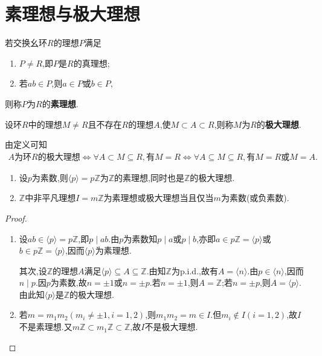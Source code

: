\documentclass[../../main.tex]{subfiles}%
\begin{document}
\section{素理想与极大理想}

\begin{definition}[素理想]
若交换幺环$R$的理想$P$满足
\begin{enumerate}[(1)]
\item $P \neq R$,即$P$是$R$的真理想;
\item 若$ab \in P$,则$a \in P$或$b \in P$,
\end{enumerate}
则称$P$为$R$的\textbf{素理想}.
\end{definition}

\begin{definition}[极大理想]
设环$R$中的理想$M \neq R$且不存在$R$的理想$A$,使$M \subset A \subset R$,则称$M$为$R$的\textbf{极大理想}.
\end{definition}
\begin{remark}
由定义可知
\begin{align*}
A\text{为环}R\text{的极大理想}\Longleftrightarrow \forall A\subset M\subseteq R,\text{有}M=R\Longleftrightarrow \forall A\subseteq M\subseteq R,\text{有}M=R\text{或}M=A.
\end{align*}
\end{remark}

\begin{proposition}
\begin{enumerate}[(1)]
\item 设$p$为素数,则$\langle p \rangle=p\mathbb{Z}$为$\mathbb{Z}$的素理想,同时也是$\mathbb{Z}$的极大理想.

\item $\mathbb{Z}$中非平凡理想$I = m\mathbb{Z}$为素理想或极大理想当且仅当$m$为素数(或负素数).
\end{enumerate}
\end{proposition}
\begin{proof}
\begin{enumerate}[(1)]
\item 设$ab \in \langle p \rangle=p\mathbb{Z}$,即$p \mid ab$.由$p$为素数知$p \mid a$或$p \mid b$,亦即$a \in p\mathbb{Z}=\langle p \rangle$或$b \in p\mathbb{Z}= \langle p \rangle$,因而$\langle p \rangle$为素理想.

其次,设$\mathbb{Z}$的理想$A$满足$\langle p \rangle \subseteq A \subseteq \mathbb{Z}$.由知$\mathbb{Z}$为p.i.d.,故有$A = \langle n \rangle$.由$p \in \langle n \rangle$,因而$n \mid p$.因$p$为素数,故$n = \pm 1$或$n = \pm p$.若$n = \pm 1$,则$A = \mathbb{Z}$;若$n = \pm p$,则$A = \langle p \rangle$.由此知$\langle p \rangle$是$\mathbb{Z}$的极大理想.

\item 若$m = m_1m_2(m_i \neq \pm 1,i = 1,2)$,则$m_1m_2 = m \in I$.但$m_i \notin I(i = 1,2)$,故$I$不是素理想.又$m\mathbb{Z} \subset m_1\mathbb{Z} \subset \mathbb{Z}$,故$I$不是极大理想.\
\end{enumerate}

\end{proof}
\end{document}
